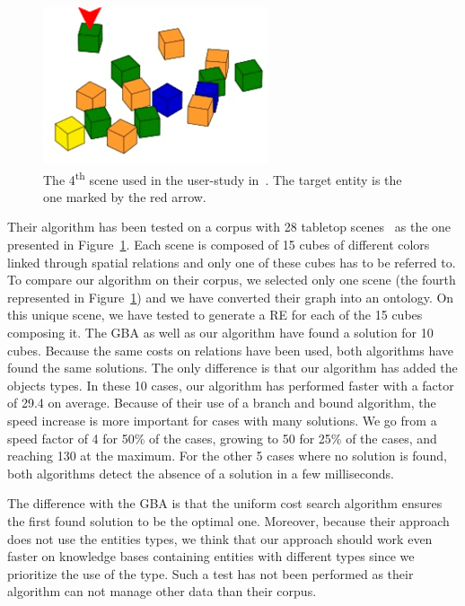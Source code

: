 \begin{figure}[h!]
\centering
\includegraphics[scale=0.7]{figures/chapter4/GBA.png}
\caption{\label{fig:chap4_gba} The 4\textsuperscript{th} scene used in the user-study in~\cite{li_2016_spatial}. The target entity is the one marked by the red arrow.}
\end{figure}

Their algorithm has been tested on a corpus with 28 tabletop scenes~\cite{li_2016_spatial} as the one presented in Figure~\ref{fig:chap4_gba}. Each scene is composed of 15 cubes of different colors linked through spatial relations and only one of these cubes has to be referred to. To compare our algorithm on their corpus, we selected only one scene (the fourth represented in Figure~\ref{fig:chap4_gba}) and we have converted their graph into an ontology. On this unique scene, we have tested to generate a RE for each of the 15 cubes composing it. The GBA as well as our algorithm have found a solution for 10 cubes. Because the same costs on relations have been used, both algorithms have found the same solutions. The only difference is that our algorithm has added the objects types. In these 10 cases, our algorithm has performed faster with a factor of 29.4 on average. Because of their use of a branch and bound algorithm, the speed increase is more important for cases with many solutions. We go from a speed factor of 4 for 50\% of the cases, growing to 50 for 25\% of the cases, and reaching 130 at the maximum. For the other 5 cases where no solution is found, both algorithms detect the absence of a solution in a few milliseconds.

The difference with the GBA is that the uniform cost search algorithm ensures the first found solution to be the optimal one. Moreover, because their approach does not use the entities types, we think that our approach should work even faster on knowledge bases containing entities with different types since we prioritize the use of the type. Such a test has not been performed as their algorithm can not manage other data than their corpus.

